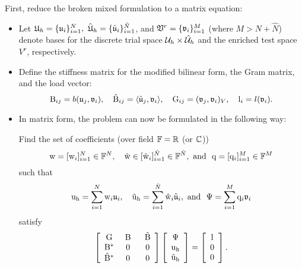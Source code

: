First, reduce the broken mixed formulation to a matrix equation:
\begin{itemize}
\item{
Let $\mathfrak{U}_h = \{ \mathfrak{u}_i \}_{i=1}^N,\ \mathfrak{\hat U}_h = \{ \mathfrak{\hat u}_i \}_{i=1}^{\hat N}$, and $\mathfrak{V}^r = \{ \mathfrak{v}_i \}_{i=1}^M$ (where $M > N+\hat N$) denote bases for the discrete trial space $\mathcal{U}_h \times \hat {\mathcal{U}}_h$ and the enriched test space $V^r$, respectively.}
\item{
Define the stiffness matrix for the modified bilinear form, the Gram matrix, and the load vector:
\[
	\mathrm{B}_{ij} = b(\mathfrak{u}_j, \mathfrak{v}_i), \quad 
	\mathrm{\hat B}_{ij} = \langle \mathfrak{\hat u}_j, \mathfrak{v}_i \rangle, \quad 
	\mathrm{G}_{ij} = (\mathfrak{v}_j, \mathfrak{v}_i)_V, \quad 
	\mathrm{l}_i = l(\mathfrak{v}_i) .
\]
}
\item{
In matrix form, the problem can now be formulated in the following way:

Find the set of coefficients (over field $\mathbb{F} = \mathbb{R}$ (or $\mathbb{C}$))
\[
	\mathrm{w} = [\mathrm{w}_i]_{i=1}^N \in \mathbb{F}^N, \quad
	\mathrm{\hat w} \in [\mathrm{\hat w}_i]_{i=1}^{\hat N} \in \mathbb{F}^{\hat N}, \text{ and }\
	\mathrm{q} = [\mathrm{q}_i]_{i=1}^M \in \mathbb{F}^M
\]
such that
\[
	\mathrm{u_h} = \sum_{i=1}^{N} \mathrm{w}_i \mathfrak{u}_i , \quad
	\mathrm{\hat{u}_h} = \sum_{i=1}^{\hat N} \mathrm{\hat w}_i \mathfrak{\hat u}_i , \text{ and }\
	\mathrm{\Psi} = \sum_{i=1}^{M} \mathrm{q}_i \mathfrak{v}_i
\]
satisfy
\[
	\left[ \begin{array}{ccc}
		\mathrm{G} & \ \mathrm{B} \ \ & \mathrm{\hat B} \\
		\mathrm{B}^* & \ \mathrm{0} \ \ & \mathrm{0}\\
		\mathrm{\hat B^*} & \ \mathrm{0} \ \ & \mathrm{0}
	\end{array} \right]
	\left[ \begin{array}{c}
		\mathrm{\Psi} \\
		\mathrm{u_h} \\
		\mathrm{\hat u_h}
	\end{array} \right]
	=
	\left[ \begin{array}{c}
		\mathrm{l} \\
		\mathrm{0} \\
		\mathrm{0}
	\end{array} \right] .
\]
}
\end{itemize}

